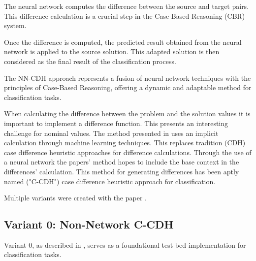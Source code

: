 \documentclass[a4paper, 12pt]{report}
\begin{document}
The neural network computes the difference between the source and target pairs.
This difference calculation is a crucial step in the Case-Based Reasoning (CBR) system.

Once the difference is computed, the predicted result obtained from the neural network is applied to the source solution.
This adapted solution is then considered as the final result of the classification process.

The NN-CDH approach represents a fusion of neural network techniques with the principles of Case-Based Reasoning, offering a dynamic and adaptable method for classification tasks.

When calculating the difference between the problem and the solution values it is important to implement a difference function.
This presents an interesting challenge for nominal values. The method presented in \cite{ye2021learning} uses an implicit calculation through machine learning techniques.
This replaces tradition (CDH) case difference heuristic approaches for difference calculations. Through the use of a neural network the papers' method hopes to include the base context in the
differences' calculation. This method for generating differences has been aptly named ("C-CDH") case difference heuristic approach for classification.

Multiple variants were created with the paper \cite{ye2021learning}.
\subsection{Variant 0: Non-Network C-CDH}

Variant 0, as described in \cite{ye2021learning}, serves as a foundational test bed implementation for classification tasks.
\end{document}
